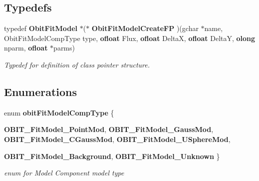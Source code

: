\subsection*{Typedefs}
\begin{CompactItemize}
\item 
typedef {\bf Obit\-Fit\-Model} $\ast$($\ast$ {\bf Obit\-Fit\-Model\-Create\-FP} )(gchar $\ast$name, Obit\-Fit\-Model\-Comp\-Type type, {\bf ofloat} Flux, {\bf ofloat} Delta\-X, {\bf ofloat} Delta\-Y, {\bf olong} nparm, {\bf ofloat} $\ast$parms)
\begin{CompactList}\small\item\em Typedef for definition of class pointer structure. \item\end{CompactList}\end{CompactItemize}
\subsection*{Enumerations}
\begin{CompactItemize}
\item 
enum {\bf obit\-Fit\-Model\-Comp\-Type} \{ \par
{\bf OBIT\_\-Fit\-Model\_\-Point\-Mod}, 
{\bf OBIT\_\-Fit\-Model\_\-Gauss\-Mod}, 
{\bf OBIT\_\-Fit\-Model\_\-CGauss\-Mod}, 
{\bf OBIT\_\-Fit\-Model\_\-USphere\-Mod}, 
\par
{\bf OBIT\_\-Fit\-Model\_\-Background}, 
{\bf OBIT\_\-Fit\-Model\_\-Unknown}
 \}
\begin{CompactList}\small\item\em enum for Model Component model type \item\end{CompactList}\end{CompactItemize}
